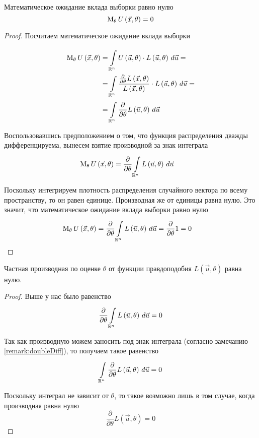 \begin{remark}\label{remark:expectationU}
     Математическое ожидание вклада выборки равно нулю
  $$\meanof{\theta}{U\left( \vec{x},\theta \right)}=0$$
\end{remark}
\begin{proof}
Посчитаем математическое ожидание вклада выборки

\begin{align*}
  \meanof{\theta}{U\left( \vec{x},\theta \right)}
    &=\integral{\mathbb{R}^n}{}{\vec{u}}
      {U\left( \vec{u},\theta \right)
        \cdot L\left( \vec{u},\theta \right)}=\\
    &=\integral{\mathbb{R}^n}{}{\vec{u}}
      {\frac{\frac{\partial}{\partial\theta}L\left(\vec{x},\theta\right)}
        {L\left(\vec{x},\theta\right)}
        \cdot L\left( \vec{u},\theta \right)}=\\
    &=\integral{\mathbb{R}^n}{}{\vec{u}}
      {\frac{\partial}{\partial\theta}
        L\left( \vec{u},\theta \right)}
\end{align*}

Воспользовавшись предположением о том,
что функция распределения дважды дифференцируема,
вынесем взятие производной за знак интеграла
\begin{align*}
  \meanof{\theta}{U\left( \vec{x},\theta \right)}
    &=\frac{\partial}{\partial\theta}
      \integral{\mathbb{R}^n}{}{\vec{u}}{L\left( \vec{u},\theta \right)}
\end{align*}

Поскольку интегрируем плотность распределения случайного вектора
по всему пространству, то он равен единице.
Производная же от единицы равна нулю.
Это значит, что математическое ожидание вклада выборки равно нулю
\begin{align*}
  \meanof{\theta}{U\left( \vec{x},\theta \right)}
    &=\frac{\partial}{\partial\theta}
      \integral{\mathbb{R}^n}{}{\vec{u}}{L\left( \vec{u},\theta \right)}
    =\frac{\partial}{\partial\theta}1
    =0
\end{align*}
\end{proof}
\begin{remark}\label{remark:partialLikelihoodNull}
  Частная производная по оценке $\theta$ от функции правдоподобия
  $L\left( \vec{u},\theta \right)$ равна нулю.
\end{remark}
\begin{proof}
  Выше у нас было равенство
  $$\frac{\partial}{\partial\theta}
    \integral{\mathbb{R}^n}{}{\vec{u}}{L\left( \vec{u},\theta \right)}=0$$

  Так как производную можем заносить под знак интеграла
  (согласно замечанию \ref{remark:doubleDiff}), то получаем такое равенство
  $$\integral{\mathbb{R}^n}{}{\vec{u}}{
    \frac{\partial}{\partial\theta}L\left( \vec{u},\theta \right)}=0$$

  Поскольку интеграл не зависит от $\theta$,
  то такое возможно лишь в том случае, когда производная равна нулю
  $$\frac{\partial}{\partial\theta}L\left( \vec{u},\theta \right)=0$$
\end{proof}
